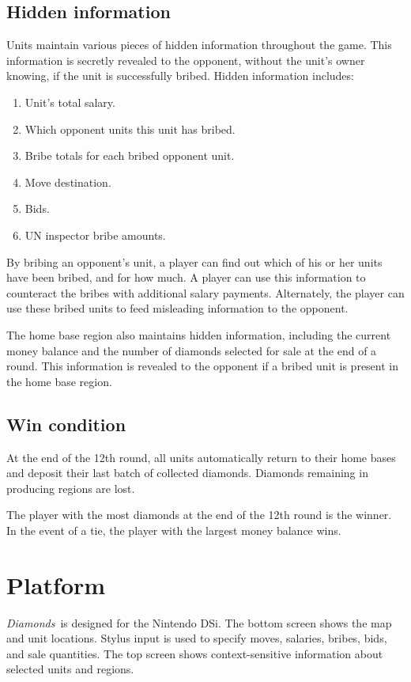 \documentclass[8pt]{extarticle}
\newcommand{\gtitle}{{\it Diamonds}}
\begin{document}
\subsection{Hidden information}
Units maintain various pieces of hidden information throughout the game.  This information is secretly revealed to the opponent, without the unit's owner knowing, if the unit is successfully bribed.  Hidden information includes:
\begin{enumerate}
\item Unit's total salary.
\item Which opponent units this unit has bribed.
\item Bribe totals for each bribed opponent unit.
\item Move destination.
\item Bids.
\item UN inspector bribe amounts.
\end{enumerate}
By bribing an opponent's unit, a player can find out which of his or her units have been bribed, and for how much.  A player can use this information to counteract the bribes with additional salary payments.  Alternately, the player can use these bribed units to feed misleading information to the opponent.

The home base region also maintains hidden information, including the current money balance and the number of diamonds selected for sale at the end of a round.  This information is revealed to the opponent if a bribed unit is present in the home base region.



\subsection{Win condition}
At the end of the 12th round, all units automatically return to their home bases and deposit their last batch of collected diamonds.  Diamonds remaining in producing regions are lost.

The player with the most diamonds at the end of the 12th round is the winner.  In the event of a tie, the player with the largest money balance wins.


\section{Platform}

\gtitle\ is designed for the Nintendo DSi.  The bottom screen shows the map and unit locations.  Stylus input is used to specify moves, salaries, bribes, bids, and sale quantities.  The top screen shows context-sensitive information about selected units and regions.
\end{document}
